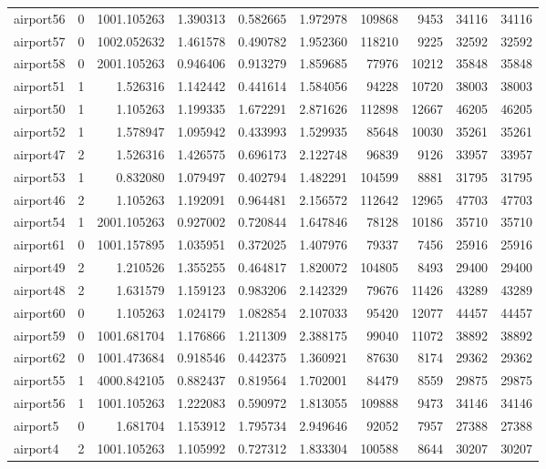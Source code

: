 \begin{longtable}{|l|r|r|r|r|r|r|r|r|r|}
airport56 & 0 & 1001.105263 & 1.390313 & 0.582665 & 1.972978 & 109868 & 9453 & 34116 & 34116 \\
airport57 & 0 & 1002.052632 & 1.461578 & 0.490782 & 1.952360 & 118210 & 9225 & 32592 & 32592 \\
airport58 & 0 & 2001.105263 & 0.946406 & 0.913279 & 1.859685 & 77976 & 10212 & 35848 & 35848 \\
airport51 & 1 & 1.526316 & 1.142442 & 0.441614 & 1.584056 & 94228 & 10720 & 38003 & 38003 \\
airport50 & 1 & 1.105263 & 1.199335 & 1.672291 & 2.871626 & 112898 & 12667 & 46205 & 46205 \\
airport52 & 1 & 1.578947 & 1.095942 & 0.433993 & 1.529935 & 85648 & 10030 & 35261 & 35261 \\
airport47 & 2 & 1.526316 & 1.426575 & 0.696173 & 2.122748 & 96839 & 9126 & 33957 & 33957 \\
airport53 & 1 & 0.832080 & 1.079497 & 0.402794 & 1.482291 & 104599 & 8881 & 31795 & 31795 \\
airport46 & 2 & 1.105263 & 1.192091 & 0.964481 & 2.156572 & 112642 & 12965 & 47703 & 47703 \\
airport54 & 1 & 2001.105263 & 0.927002 & 0.720844 & 1.647846 & 78128 & 10186 & 35710 & 35710 \\
airport61 & 0 & 1001.157895 & 1.035951 & 0.372025 & 1.407976 & 79337 & 7456 & 25916 & 25916 \\
airport49 & 2 & 1.210526 & 1.355255 & 0.464817 & 1.820072 & 104805 & 8493 & 29400 & 29400 \\
airport48 & 2 & 1.631579 & 1.159123 & 0.983206 & 2.142329 & 79676 & 11426 & 43289 & 43289 \\
airport60 & 0 & 1.105263 & 1.024179 & 1.082854 & 2.107033 & 95420 & 12077 & 44457 & 44457 \\
airport59 & 0 & 1001.681704 & 1.176866 & 1.211309 & 2.388175 & 99040 & 11072 & 38892 & 38892 \\
airport62 & 0 & 1001.473684 & 0.918546 & 0.442375 & 1.360921 & 87630 & 8174 & 29362 & 29362 \\
airport55 & 1 & 4000.842105 & 0.882437 & 0.819564 & 1.702001 & 84479 & 8559 & 29875 & 29875 \\
airport56 & 1 & 1001.105263 & 1.222083 & 0.590972 & 1.813055 & 109888 & 9473 & 34146 & 34146 \\
airport5 & 0 & 1.681704 & 1.153912 & 1.795734 & 2.949646 & 92052 & 7957 & 27388 & 27388 \\
airport4 & 2 & 1001.105263 & 1.105992 & 0.727312 & 1.833304 & 100588 & 8644 & 30207 & 30207 \\

\end{longtable}
